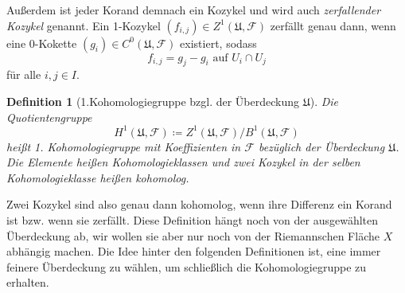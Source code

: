 \documentclass[11pt,a4paper,toc=bibliography]{scrartcl}
\theoremstyle{thm}
\theoremstyle{def}
\newtheorem{defi}{Definition}[section]
\theoremstyle{remark}
\begin{document}
Außerdem ist jeder Korand demnach ein Kozykel und wird auch \emph{zerfallender Kozykel} genannt.
Ein 1-Kozykel $(f_{i,j})\in Z^1(\mathfrak{U}, \mathcal{F})$ zerfällt genau dann, wenn eine 0-Kokette $ (g_i) \in C^0(\mathfrak{U}, \mathcal{F})$ existiert, sodass 
\[
f_{i,j} = g_j-g_i \text{ auf } U_i\cap U_j
\]
für alle $i,j\in I$.
\begin{defi}[1.Kohomologiegruppe bzgl. der Überdeckung $\mathfrak{U}$]
Die Quotientengruppe 
\[
H^1(\mathfrak{U},\mathcal{F})\coloneqq  {Z^1(\mathfrak{U}, \mathcal{F})}/{B^1(\mathfrak{U}, \mathcal{F})} 
\]
heißt \emph{1. Kohomologiegruppe} mit Koeffizienten in $\mathcal{F}$ bezüglich der Überdeckung $\mathfrak{U}$.
Die Elemente heißen \emph{Kohomologieklassen} und zwei Kozykel in der selben Kohomologieklasse heißen \emph{kohomolog}.
\end{defi}
Zwei Kozykel sind also genau dann kohomolog, wenn ihre Differenz ein Korand ist bzw. wenn sie zerfällt.
Diese Definition hängt noch von der ausgewählten Überdeckung ab, wir wollen sie aber nur noch von der Riemannschen Fläche $X$ abhängig machen. Die Idee hinter den folgenden Definitionen ist, eine immer feinere Überdeckung zu wählen, um schließlich die Kohomologiegruppe zu erhalten.
\end{document}
